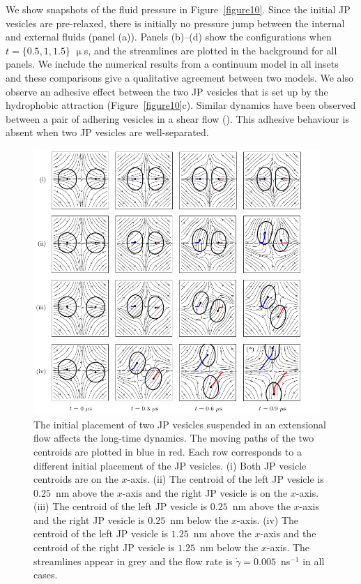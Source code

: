 \documentclass[lineno]{jfm}
\begin{document}
We show snapshots of the fluid pressure in Figure~\ref{figure10}. Since the
initial JP vesicles are pre-relaxed, there is initially no pressure jump
between the internal and external fluids (panel (a)). Panels (b)--(d)
show the configurations when $t = \{0.5,1,1.5\}$ $\upmu$s, and the
streamlines are plotted in the background for all panels. 
We include the numerical results from a continuum model in all insets and these
comparisons give a qualitative agreement between two models.
We also observe an adhesive
effect between the two JP vesicles that is set up by the hydrophobic
attraction (Figure~\ref{figure10}c). Similar dynamics have been observed between a pair of adhering vesicles in a shear flow
(\cite{qua-vee-you2019, abb-far-ezz-ben-mis2021}). This adhesive
behaviour is absent when two JP vesicles are well-separated.

\begin{figure}
\begin{center}
\includegraphics[width=0.97\textwidth]{Figure11_Wrapper_New.pdf}
\end{center} 
  \caption{\label{figure11} The initial placement of two JP vesicles
  suspended in an extensional flow affects the long-time dynamics. The
  moving paths of the two centroids are plotted in blue in red. Each row
  corresponds to a different initial placement of the JP vesicles. (i)
  Both JP vesicle centroids are on the $x$-axis. (ii) The centroid of
  the left JP vesicle is $0.25$~nm above the $x$-axis and the right JP
  vesicle is on the $x$-axis. (iii) The centroid of the left JP vesicle
  is $0.25$~nm above the $x$-axis and the right JP vesicle is $0.25$~nm
  below the $x$-axis. (iv) The centroid of the left JP vesicle is
  $1.25$~nm above the $x$-axis and the centroid of the right JP vesicle
  is $1.25$~nm below the $x$-axis. The streamlines appear in grey and
  the flow rate is $\dot \gamma =0.005$~ns$^{-1}$ in all cases.
	  }
\end{figure}
\end{document}

